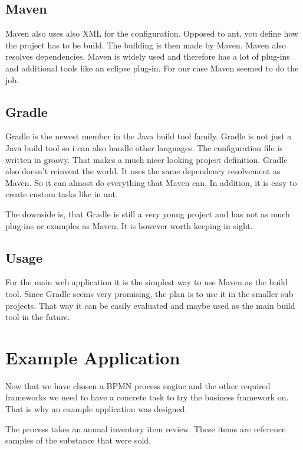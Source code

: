 \documentclass[paper=a4,twoside=false,BCOR=0mm,DIV=calc,fontsize=12pt]{scrartcl}
\begin{document}
\subsection{Maven}
Maven also uses also XML for the configuration. Opposed to ant, you define how the project has to be build. The building is then
made by Maven. Maven also resolves dependencies. Maven is widely used and therefore has a lot of plug-ins and additional tools like an eclipse plug-in. For our case Maven seemed to do the job.


\subsection{Gradle}
Gradle is the newest member in the Java build tool family. Gradle is not just a Java build tool so i can also handle other languages. The configuration file is written in groovy. That makes a much nicer looking project definition.
Gradle also doesn't reinvent the world. It uses the same dependency resolvement as Maven. So it can almost do everything that Maven can. In addition, it is easy to create custom tasks like in ant.

The downside is, that Gradle is still a very young project and has not as much plug-ins or examples as Maven. It is however worth keeping in sight.

\subsection{Usage}
For the main web application it is the simplest way to use Maven as the build tool. Since Gradle seems very promising, the plan is to use it in the
smaller sub projects. That way it can be easily evaluated and maybe used as the main build tool in the future.


\section{Example Application}
Now that we have chosen a BPMN process engine and the other required frameworks we need to have a concrete task to try the business framework on. That is why an example application was designed.

The process takes an annual inventory item review. These items are reference samples of the substance that were sold.
\end{document}
